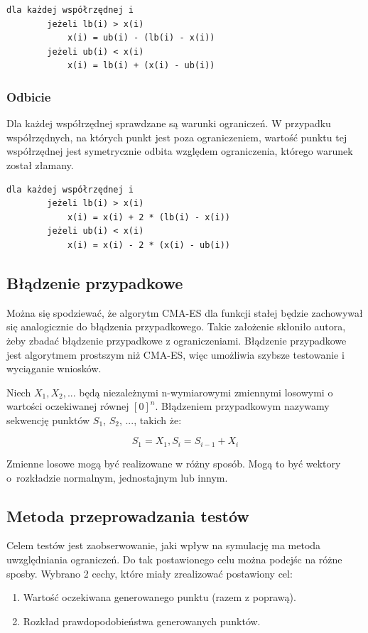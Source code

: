\documentclass{mini}
\begin{document}
\begin{Verbatim}[baselinestretch=1.1]
	dla każdej współrzędnej i
		jeżeli lb(i) > x(i)
			x(i) = ub(i) - (lb(i) - x(i))
		jeżeli ub(i) < x(i)
			x(i) = lb(i) + (x(i) - ub(i))
\end{Verbatim}

\subsubsection{Odbicie}
Dla każdej współrzędnej sprawdzane są warunki ograniczeń. W przypadku współrzędnych, na których punkt jest poza ograniczeniem, wartość punktu tej współrzędnej jest symetrycznie odbita względem ograniczenia, którego warunek został złamany.

\begin{Verbatim}[baselinestretch=1.1]
	dla każdej współrzędnej i
		jeżeli lb(i) > x(i)
			x(i) = x(i) + 2 * (lb(i) - x(i))
		jeżeli ub(i) < x(i)
			x(i) = x(i) - 2 * (x(i) - ub(i))
\end{Verbatim}

\subsection{Błądzenie przypadkowe} \label{bladzenie}

Można się spodziewać, że algorytm CMA-ES dla funkcji stałej będzie zachowywał się analogicznie do błądzenia przypadkowego. Takie założenie skłoniło autora, żeby zbadać błądzenie przypadkowe z ograniczeniami. Błądzenie przypadkowe jest algorytmem prostszym niż CMA-ES, więc umożliwia szybsze testowanie i wyciąganie wniosków.

Niech $ X_1, X_2, ... $ będą niezależnymi n-wymiarowymi zmiennymi losowymi o wartości oczekiwanej równej $ [0]^n $. Błądzeniem przypadkowym nazywamy sekwencję punktów $S_1$, $S_2$, ..., takich że:

\begin{equation}
S_1 = X_1, S_i=S_{i-1}+X_i
\end{equation}

Zmienne losowe mogą być realizowane w różny sposób. Mogą to być wektory o~rozkładzie normalnym, jednostajnym lub innym.

\subsection{Metoda przeprowadzania testów}
Celem testów jest zaobserwowanie, jaki wpływ na symulację ma metoda uwzględniania ograniczeń. Do tak postawionego celu można podejśc na różne sposby. Wybrano 2 cechy, które miały zrealizować postawiony cel:
\begin{enumerate}
\item Wartość oczekiwana generowanego punktu (razem z poprawą).
\item Rozkład prawdopodobieństwa generowanych punktów.
\end{enumerate}
\end{document}
